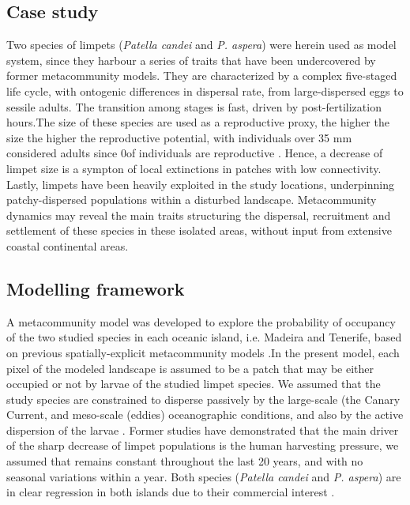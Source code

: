 \documentclass[12pt]{article}
\begin{document}
\begin{justify}
{{{{{\subsection{Case study}
Two species of limpets (\textit{Patella candei} and \textit{P. aspera}) were herein used as model system, since they harbour a series of traits that have been undercovered by former metacommunity models. They are characterized by a complex five-staged life cycle, with ontogenic differences in dispersal rate, from large-dispersed eggs to sessile adults. The transition among stages is fast, driven by post-fertilization hours.The size of these species are used as a reproductive proxy, the higher the size the higher the reproductive potential, with individuals over 35 mm considered adults since 0\percent of individuals are reproductive \citep{henriques2012life}. Hence, a decrease of limpet size is a sympton of local extinctions in patches with low connectivity. Lastly, limpets have been heavily exploited in the study locations, underpinning patchy-dispersed populations within a disturbed landscape. Metacommunity dynamics may reveal the main traits structuring the dispersal, recruitment and settlement of these species in these isolated areas, without input from extensive coastal continental areas.

\subsection{Modelling framework}
A metacommunity model was developed to explore the probability of occupancy of the two studied species in each oceanic island, i.e. Madeira and Tenerife, based on previous spatially-explicit metacommunity models \citep{hanski1999habitat,hanski2000metapopulation, ovaskainen2001spatially, hanski2002extinction, bertuzzo2015metapopulation}.In the present model, each pixel of the modeled landscape is assumed to be a patch that may be either occupied or not by larvae of the studied limpet species. We assumed that the study species are constrained to disperse passively by the large-scale (the Canary Current, \citep{barton1998transition} and meso-scale (eddies) oceanographic conditions, and also by the active dispersion of the larvae \citep{henriques2012life}. Former studies have demonstrated that the main driver of the sharp decrease of limpet populations is the human harvesting pressure, we assumed that remains constant throughout the last 20 years, and with no seasonal variations within a year. Both species (\textit{Patella candei} and \textit{P. aspera}) are in clear regression in both islands due to their commercial interest \citep{riera2016clear, sousa2019long}.

}}}}}
\end{justify}
\end{document}
